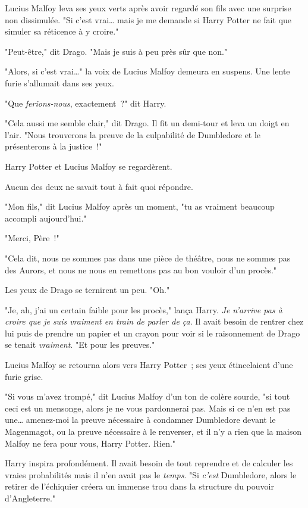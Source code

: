 Lucius Malfoy leva ses yeux verts après avoir regardé son fils avec une surprise non dissimulée. "Si c'est vrai… mais je me demande si Harry Potter ne fait que simuler sa réticence à y croire."

"Peut-être," dit Drago. "Mais je suis à peu près sûr que non."

"Alors, si c'est vrai…" la voix de Lucius Malfoy demeura en suspens. Une lente furie s'allumait dans ses yeux.

"Que \emph{ferions-nous}, exactement~?" dit Harry.

"Cela aussi me semble clair," dit Drago. Il fit un demi-tour et leva un doigt en l'air. "Nous trouverons la preuve de la culpabilité de Dumbledore et le présenterons à la justice~!"

Harry Potter et Lucius Malfoy se regardèrent.

Aucun des deux ne savait tout à fait quoi répondre.

"Mon fils," dit Lucius Malfoy après un moment, "tu as vraiment beaucoup accompli aujourd'hui."

"Merci, Père~!"

"Cela dit, nous ne sommes pas dans une pièce de théâtre, nous ne sommes pas des Aurors, et nous ne nous en remettons pas au bon vouloir d'un procès."

Les yeux de Drago se ternirent un peu. "Oh."

"Je, ah, j'ai un certain faible pour les procès," lança Harry. \emph{Je n'arrive pas à croire que je suis vraiment en train de parler de ça}. Il avait besoin de rentrer chez lui puis de prendre un papier et un crayon pour voir si le raisonnement de Drago se tenait \emph{vraiment}. "Et pour les preuves."

Lucius Malfoy se retourna alors vers Harry Potter~; ses yeux étincelaient d'une furie grise.

"Si vous m'avez trompé," dit Lucius Malfoy d'un ton de colère sourde, "si tout ceci est un mensonge, alors je ne vous pardonnerai pas. Mais si ce n'en est pas une… amenez-moi la preuve nécessaire à condamner Dumbledore devant le Magenmagot, ou la preuve nécessaire à le renverser, et il n'y a rien que la maison Malfoy ne fera pour vous, Harry Potter. Rien."

Harry inspira profondément. Il avait besoin de tout reprendre et de calculer les vraies probabilités mais il n'en avait pas le \emph{temps}. "Si \emph{c'est} Dumbledore, alors le retirer de l'échiquier créera un immense trou dans la structure du pouvoir d'Angleterre."

